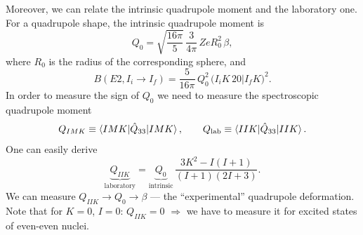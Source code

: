 \documentclass[11pt,a4paper]{article}
\newcommand{\op}[1]{\hat{#1}}
\begin{document}
Moreover, we can relate the intrinsic quadrupole moment and the laboratory one. For a quadrupole shape, the intrinsic quadrupole moment is
\[
Q_0=\sqrt{\frac{16\pi}{5}}\,\frac{3}{4\pi}\,ZeR_0^2\,\beta,
\]
where $R_0$ is the radius of the corresponding sphere, and
\[
B(E2,I_i\to I_f)=\frac{5}{16\pi}\,Q_0^2\,\big(I_iK\,20\big|I_fK\big)^2 .
\]
In order to measure the sign of $Q_0$ we need to measure the spectroscopic quadrupole moment
\[
Q_{IMK}\equiv\braket{IMK|\op Q_{33}|IMK},\qquad Q_{\rm lab}\equiv\braket{IIK|\op Q_{33}|IIK}.
\]
One can easily derive
\[
\underbrace{Q_{IIK}}_{\text{laboratory}}=\underbrace{Q_0}_{\text{intrinsic}}\,\frac{3K^2-I(I+1)}{(I+1)(2I+3)} .
\]
We can measure $Q_{IIK}\to Q_0\to\beta$ --- the ``experimental'' quadrupole deformation.
Note that for $K=0$, $I=0$: $Q_{IIK}=0$ $\Rightarrow$ we have to measure it for excited states of even-even nuclei.

\end{document}
